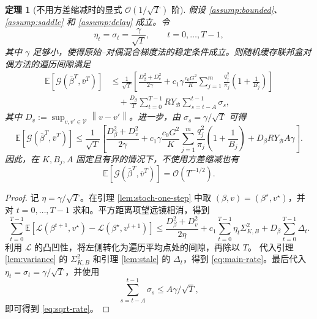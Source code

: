 \documentclass[UTF8,a4paper,11pt]{ctexart}
\newtheorem{theorem}{定理}
\newcommand{\E}{\mathbb{E}}
\newcommand{\V}{\mathcal{V}}
\newcommand{\B}{\mathcal{B}}
\newcommand{\Gap}{\mathcal{G}}
\newcommand{\norm}[1]{\left\|#1\right\|}
\begin{document}
\begin{theorem}[不用方差缩减时的显式 $\mathcal{O}(1/\sqrt{T})$ 阶]
\label{thm:main}
假设 \ref{assump:bounded}、\ref{assump:saddle} 和 \ref{assump:delay} 成立。令
\[
    \eta_t=\sigma_t=\frac{\gamma}{\sqrt{T}},
    \qquad
    t=0,\ldots,T-1,
\]
其中 $\gamma$ 足够小，使得原始--对偶混合梯度法的稳定条件成立。则随机缓存联邦盒对偶方法的遍历间隙满足
\begin{align}
    \E[
    \Gap(\bar{\beta}^T,\bar v^T)
    ]
    &\le
    \frac{1}{\sqrt{T}}
    \left[
        \frac{D_\beta^2+D_v^2}{2\gamma}
        +
        c_1\gamma
        \frac{c_0G^2}{K}
        \sum_{j=1}^m
        \frac{q_j^2}{\pi_j}
        \left(
            1+\frac{1}{B_j}
        \right)
    \right]
    \nonumber\\
    &\quad+
    \frac{D_\beta}{T}
    \sum_{t=0}^{T-1}
    RY_\B
    \sum_{s=t-A}^{t-1}\sigma_s ,
    \label{eq:main-rate}
\end{align}
其中 $D_v:=\sup_{v,v'\in\V}\norm{v-v'}$。进一步，由
$\sigma_s=\gamma/\sqrt{T}$ 可得
\begin{equation}
    \E[
    \Gap(\bar{\beta}^T,\bar v^T)
    ]
    \le
    \frac{1}{\sqrt{T}}
    \left[
        \frac{D_\beta^2+D_v^2}{2\gamma}
        +
        c_1\gamma
        \frac{c_0G^2}{K}
        \sum_{j=1}^m
        \frac{q_j^2}{\pi_j}
        \left(
            1+\frac{1}{B_j}
        \right)
        +
        D_\beta RY_\B A\gamma
    \right].
    \label{eq:sqrt-rate}
\end{equation}
因此，在 $K,B_j,A$ 固定且有界的情况下，不使用方差缩减也有
\[
    \E[
    \Gap(\bar{\beta}^T,\bar v^T)
    ]
    =
    \mathcal{O}(T^{-1/2}).
\]
\end{theorem}

\begin{proof}
记 $\eta=\gamma/\sqrt{T}$。在引理 \ref{lem:stoch-one-step} 中取
$(\beta,v)=(\beta^\star,v^\star)$，并对
$t=0,\ldots,T-1$ 求和。平方距离项望远镜相消，得到
\[
    \sum_{t=0}^{T-1}
    \E[
    \mathcal{L}(\beta^{t+1},v^\star)
    -
    \mathcal{L}(\beta^\star,v^{t+1})
    ]
    \le
    \frac{D_\beta^2+D_v^2}{2\eta}
    +
    c_1\sum_{t=0}^{T-1}\eta_t\Sigma_{K,B}^2
    +
    D_\beta\sum_{t=0}^{T-1}\Delta_t.
\]
利用 $\mathcal{L}$ 的凸凹性，将左侧转化为遍历平均点处的间隙，再除以 $T$。
代入引理 \ref{lem:variance} 的 $\Sigma_{K,B}^2$ 和引理 \ref{lem:stale} 的
$\Delta_t$，得到 \eqref{eq:main-rate}。最后代入
$\eta_t=\sigma_t=\gamma/\sqrt{T}$，并使用
\[
    \sum_{s=t-A}^{t-1}\sigma_s
    \le
    A\gamma/\sqrt{T},
\]
即可得到 \eqref{eq:sqrt-rate}。
\end{proof}
\end{document}
